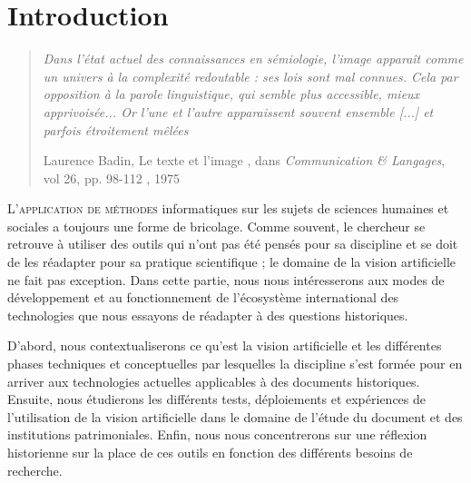 \section*{Introduction}


\begin{quote}
    \textit{Dans l'état actuel des connaissances en sémiologie, l'image apparaît comme un univers à la complexité redoutable : ses lois sont mal connues. Cela par opposition à la parole linguistique, qui semble plus accessible, mieux apprivoisée... Or l'une et l'autre apparaissent souvent ensemble [...] et parfois étroitement mêlées}\vspace{0.2cm}
    
    Laurence Badin, \og  Le texte et l'image \fg, dans \textit{Communication \& Langages}, vol 26, pp. 98-112 , 1975
\end{quote}

\lettrine{L}{'application de méthodes} informatiques sur les sujets de sciences humaines et sociales a toujours une forme de bricolage. Comme souvent, le chercheur se retrouve à utiliser des outils qui n'ont pas été pensés pour sa discipline et se doit de les réadapter pour sa pratique scientifique ; le domaine de la vision artificielle ne fait pas exception. Dans cette partie, nous nous intéresserons aux modes de développement et au fonctionnement de l'écosystème international des technologies que nous essayons de réadapter à des questions historiques. 

D'abord, nous contextualiserons ce qu'est la vision artificielle et les différentes phases techniques et conceptuelles par lesquelles la discipline s'est formée pour en arriver aux technologies actuelles applicables à des documents historiques. Ensuite, nous étudierons les différents tests, déploiements et expériences de l'utilisation de la vision artificielle dans le domaine de l'étude du document et des institutions patrimoniales. Enfin, nous nous concentrerons sur une réflexion historienne sur la place de ces outils en fonction des différents besoins de recherche. 